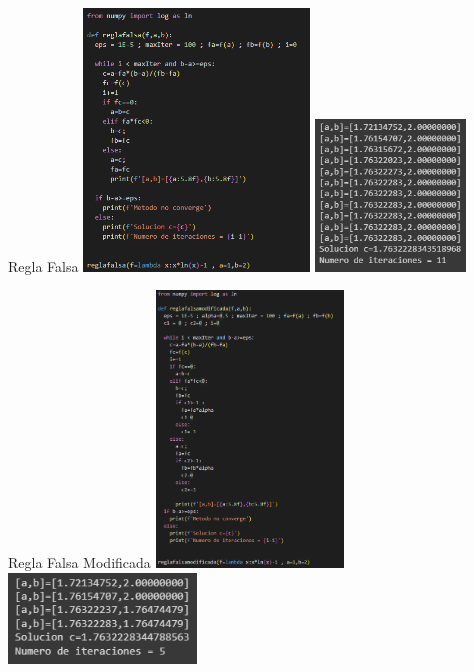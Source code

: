 \begin{frame}{Regla Falsa}
    \includegraphics[width=6cm]{p10-codigo-regla-falsa.png}
        \includegraphics[width=4cm]{p10-ejecucion-regla-falsa.png}
\end{frame}
\begin{frame}{Regla Falsa Modificada}
    \includegraphics[width=5cm]{p10-codigo-regla-falsa-modificada.png}
        \includegraphics[width=5cm]{p10-ejecucion-regla-falsa-modificada.png}
\end{frame}

